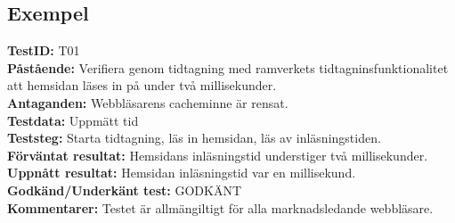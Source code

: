 \subsection*{Exempel}
\textbf{TestID:} T01\\
\textbf{Påstående:} Verifiera genom tidtagning med ramverkets tidtagninsfunktionalitet att hemsidan läses in på under två millisekunder. \\
\textbf{Antaganden:} Webbläsarens cacheminne är rensat. \\
\textbf{Testdata:} Uppmätt tid \\
\textbf{Teststeg:} Starta tidtagning, läs in hemsidan, läs av inläsningstiden. \\
\textbf{Förväntat resultat: } Hemsidans inläsningstid understiger två millisekunder. \\
\textbf{Uppnått resultat:} Hemsidan inläsningstid var en millisekund.\\
\textbf{Godkänd/Underkänt test: } GODKÄNT \\
\textbf{Kommentarer:} Testet är allmängiltigt för alla marknadsledande webbläsare. 